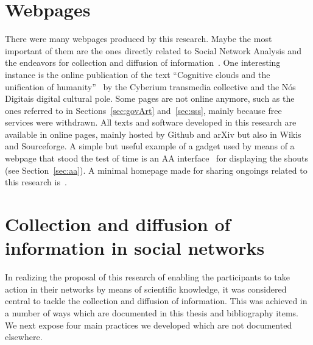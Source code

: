 \begin{apendicesenv}
\section{Webpages}
There were many webpages produced by this research.
Maybe the most important of them are the ones directly related
to Social Network Analysis and the endeavors for collection and diffusion of information~\cite{sfARS,rfARS}.
One interesting instance is the online publication of the text ``Cognitive clouds and the unification of humanity''~\cite{nuvens}
by the Cyberium transmedia collective and the Nós Digitais digital cultural pole.
Some pages are not online anymore, such as the ones referred to in Sections~\ref{sec:govArt} and~\ref{sec:sss},
mainly because free services were withdrawn.
All texts and software developed in this research are available in online pages,
mainly hosted by Github and arXiv but also in Wikis and Sourceforge.
A simple but useful example of a gadget used by means of a webpage that
stood the test of time is an AA interface~\cite{aaclient} for displaying the shouts
(see Section~\ref{sec:aa}).
A minimal homepage made for sharing ongoings related to this research is~\cite{ttmio}.

\section{Collection and diffusion of information in social networks}\label{sec:colDif}
In realizing the proposal of this research of enabling the participants to take action
in their networks by means of scientific knowledge, it was considered central
to tackle the collection and diffusion of information.
This was achieved in a number of ways which are documented in this thesis and bibliography items.
We next expose four main practices we developed which are not documented elsewhere.


\end{apendicesenv}
